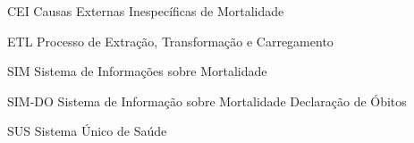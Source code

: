 \begin{siglas}
    
    \item[CEI] Causas Externas Inespecíficas de Mortalidade
    \item[ETL] Processo de Extração, Transformação e Carregamento
    \item[SIM] Sistema de Informações sobre Mortalidade
    \item[SIM-DO] Sistema de Informação sobre Mortalidade Declaração de Óbitos
    \item[SUS] Sistema Único de Saúde
    
\end{siglas}
